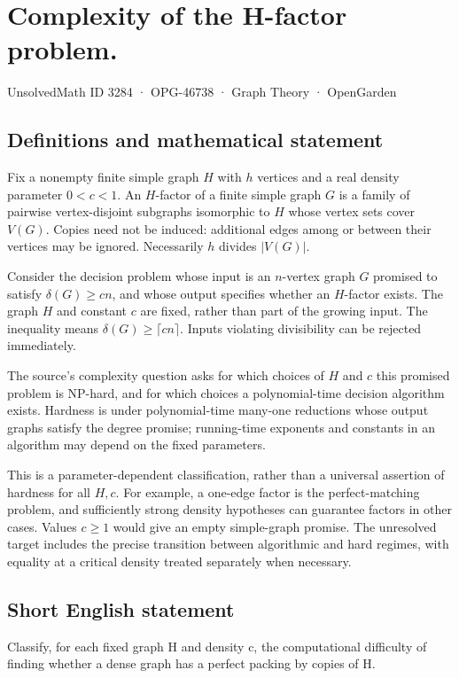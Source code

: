 \documentclass[11pt,a4paper]{article}
\begin{document}
\section*{Complexity of the H-factor problem.}\label{3284}
{\small UnsolvedMath ID 3284 · OPG-46738 · Graph Theory · OpenGarden}
\subsection{Definitions and mathematical statement}
Fix a nonempty finite simple graph $H$ with $h$ vertices and a real density parameter $0<c<1$. An $H$-factor of a finite simple graph $G$ is a family of pairwise vertex-disjoint subgraphs isomorphic to $H$ whose vertex sets cover $V(G)$. Copies need not be induced: additional edges among or between their vertices may be ignored. Necessarily $h$ divides $|V(G)|$.

Consider the decision problem whose input is an $n$-vertex graph $G$ promised to satisfy $\delta(G)\ge cn$, and whose output specifies whether an $H$-factor exists. The graph $H$ and constant $c$ are fixed, rather than part of the growing input. The inequality means $\delta(G)\ge\lceil cn\rceil$. Inputs violating divisibility can be rejected immediately.

The source’s complexity question asks for which choices of $H$ and $c$ this promised problem is NP-hard, and for which choices a polynomial-time decision algorithm exists. Hardness is under polynomial-time many-one reductions whose output graphs satisfy the degree promise; running-time exponents and constants in an algorithm may depend on the fixed parameters.

This is a parameter-dependent classification, rather than a universal assertion of hardness for all $H,c$. For example, a one-edge factor is the perfect-matching problem, and sufficiently strong density hypotheses can guarantee factors in other cases. Values $c\ge1$ would give an empty simple-graph promise. The unresolved target includes the precise transition between algorithmic and hard regimes, with equality at a critical density treated separately when necessary.
\subsection{Short English statement}
Classify, for each fixed graph H and density c, the computational difficulty of finding whether a dense graph has a perfect packing by copies of H.
\end{document}
